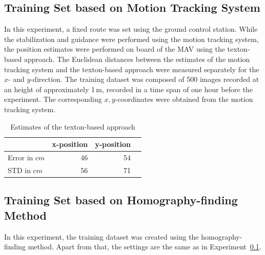 \documentclass[11pt]{report}
\begin{document}
\subsection{Training Set based on Motion Tracking System}
\label{sec:experiment-real}

In this experiment, a fixed route was set using the ground control
station. While the stabilization and guidance were performed using the
motion tracking system, the position estimates were performed on board
of the MAV using the texton-based approach. The Euclidean distances
between the estimates of the motion tracking system and the
texton-based approach were measured separately for the $x$- and
$y$-direction.  The training dataset was composed of 500 images
recorded at an height of approximately 1\,m, recorded in a time span
of one hour before the experiment. The corresponding $x,y$-coordinates
were obtained from the motion tracking system.

\begin{table}[H]
  \centering
  \begin{tabular}{lrrr}
    \toprule
    & x-position & y-position\\
    \midrule
    Error in $cm$ & 46 & 54\\
    STD in $cm$ & 56 & 71\\
    \bottomrule
  \end{tabular}
  \caption[Estimates of the texton-based approach]{Estimates of the texton-based approach}
  \label{tab:route}
\end{table}

\subsection{Training Set based on Homography-finding Method}
\label{sec:traininghomo}

In this experiment, the training dataset was created using the
homography-finding method. Apart from that, the settings are the same
as in Experiment~\ref{sec:experiment-real}.
\end{document}
